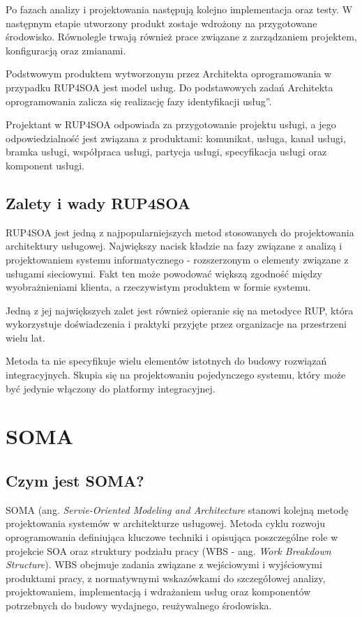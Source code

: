 Po fazach analizy i projektowania następują kolejno implementacja oraz testy. W następnym etapie utworzony produkt zostaje wdrożony na przygotowane środowisko. Równolegle trwają również prace związane z zarządzaniem projektem, konfiguracją oraz zmianami. \cite{PlatIntGor}

Podstwowym produktem wytworzonym przez Architekta oprogramowania w przypadku RUP4SOA jest model usług. Do podstawowych zadań Architekta oprogramowania zalicza się realizację fazy \quotedblbase identyfikacji usług\textquotedblright.

Projektant w RUP4SOA odpowiada za przygotowanie projektu usługi, a jego odpowiedzialność jest związana z produktami: komunikat, usługa, kanał usługi, bramka usługi, współpraca usługi, partycja usługi, specyfikacja usługi oraz komponent usługi. 

\subsection{Zalety i wady RUP4SOA}
RUP4SOA jest jedną z najpopularniejszych metod stosowanych do projektowania architektury usługowej. Największy nacisk kładzie na fazy związane z analizą i projektowaniem systemu informatycznego - rozszerzonym o elementy związane z usługami sieciowymi. Fakt ten może powodować większą zgodność między wyobrażnieniami klienta, a rzeczywistym produktem w formie systemu. 

Jedną z jej największych zalet jest również opieranie się na metodyce RUP, która wykorzystuje doświadczenia i praktyki przyjęte przez organizacje na przestrzeni wielu lat. \cite{JonSimRUPSoa}

Metoda ta nie specyfikuje wielu elementów istotnych do budowy rozwiązań integracyjnych. Skupia się na projektowaniu pojedynczego systemu, który może być jedynie włączony do platformy integracyjnej. \cite{PlatIntGor}

\section{SOMA}
\subsection{Czym jest SOMA?}
SOMA (ang. \textit{Servie-Oriented Modeling and Architecture} stanowi kolejną metodę projektowania systemów w architekturze usługowej. \cite{PlatIntGor} Metoda cyklu rozwoju oprogramowania definiująca kluczowe techniki i opisująca poszczególne role w projekcie SOA oraz struktury podziału pracy (WBS - ang. \textit{Work Breakdown Structure}). WBS obejmuje zadania związane z wejściowymi i wyjściowymi produktami pracy, z normatywnymi wskazówkami do szczegółowej analizy, projektowaniem, implementacją i wdrażaniem usług oraz komponentów potrzebnych do budowy wydajnego, reużywalnego środowiska.

